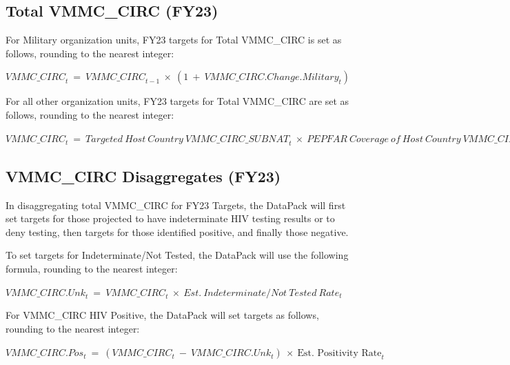 \documentclass[
  openany]{book}
\begin{document}
\hypertarget{total-vmmc_circ-fy23}{%
\subsection{Total VMMC\_CIRC (FY23)}\label{total-vmmc_circ-fy23}}

For Military organization units, FY23 targets for Total VMMC\_CIRC is set
as follows, rounding to the nearest integer:

\begin{center} ${VMMC\_ CIRC}_{t}\  = \ {VMMC\_ CIRC}_{t - 1}\  \times \ (1\  + \ {VMMC\_ CIRC.Change.Military}_{t})$ \end{center}

For all other organization units, FY23 targets for Total VMMC\_CIRC are
set as follows, rounding to the nearest integer:

\begin{center} ${VMMC\_ CIRC}_{t}\  = \ {Targeted\ Host\ Country\ VMMC\_ CIRC\_ SUBNAT}_{t}\  \times \ {PEPFAR\ Coverage\ of\ Host\ Country\ VMMC\_ CIRC\_ SUBNAT}_{t}$ \end{center}

\hypertarget{vmmc_circ-disaggregates-fy23}{%
\subsection{VMMC\_CIRC Disaggregates (FY23)}\label{vmmc_circ-disaggregates-fy23}}

In disaggregating total VMMC\_CIRC for FY23 Targets, the DataPack will
first set targets for those projected to have indeterminate HIV testing
results or to deny testing, then targets for those identified positive,
and finally those negative.

To set targets for Indeterminate/Not Tested, the DataPack will use the
following formula, rounding to the nearest integer:

\begin{center} ${VMMC\_ CIRC.Unk}_{t}\  = \ {VMMC\_ CIRC}_{t}\  \times \ {Est.\ Indeterminate}/{Not\ Tested\ Rate}_{t}$ \end{center}

For VMMC\_CIRC HIV Positive, the DataPack will set targets as follows,
rounding to the nearest integer:

\begin{center} ${VMMC\_ CIRC.Pos}_{t}\  = \ ({VMMC\_ CIRC}_{t}\  - \ {VMMC\_ CIRC.Unk}_{t})\  \times \ \text{Est.\ Positivity\ Rate}_{t}$ \end{center}
\end{document}
